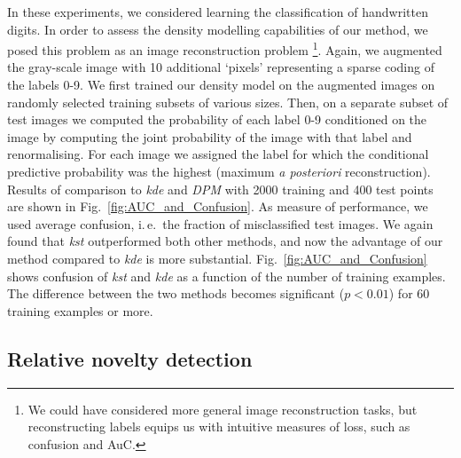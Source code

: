 \documentclass[twoside]{article}
\newcommand{\ourmethod}{kst}
\newcommand{\figref}[1]{Fig.~\ref{#1}}
\newcommand{\ie}{i.\,e.\ }
\begin{document}
In these experiments, we considered learning the classification of handwritten digits. In order to assess the density modelling capabilities of our method, we posed this problem as an image reconstruction problem \footnote{We could have considered more general image reconstruction tasks, but reconstructing labels equips us with intuitive measures of loss, such as confusion and AuC.}. Again, we augmented the gray-scale image with 10 additional `pixels' representing a sparse coding of the labels 0-9. We first trained our density model on the augmented images on randomly selected training subsets of various sizes. Then, on a separate subset of test images we computed the probability of each label 0-9 conditioned on the image by computing the joint probability of the image with that label and renormalising. For each image we assigned the label for which the conditional predictive probability was the highest (maximum \emph{a posteriori} reconstruction). Results of comparison to \emph{kde} and \emph{DPM} with 2000 training and 400 test points are shown in \figref{fig:AUC_and_Confusion}. As measure of performance, we used average confusion, \ie the fraction of misclassified test images. We again found that \emph{kst} outperformed both other methods, and now the advantage of our method compared to \emph{kde} is more substantial. Fig.~\ref{fig:AUC_and_Confusion} shows confusion of \emph{\ourmethod} and \emph{kde} as a function of the number of training examples. The difference between the two methods becomes significant ($p<0.01$) for 60 training examples or more.


\subsection{Relative novelty detection}
\end{document}
